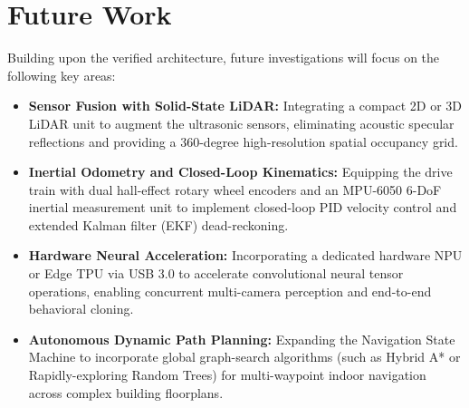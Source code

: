 \section{Future Work}
Building upon the verified architecture, future investigations will focus on the following key areas:
\begin{itemize}
    \item \textbf{Sensor Fusion with Solid-State LiDAR:} Integrating a compact 2D or 3D LiDAR unit to augment the ultrasonic sensors, eliminating acoustic specular reflections and providing a 360-degree high-resolution spatial occupancy grid.
    \item \textbf{Inertial Odometry and Closed-Loop Kinematics:} Equipping the drive train with dual hall-effect rotary wheel encoders and an MPU-6050 6-DoF inertial measurement unit to implement closed-loop PID velocity control and extended Kalman filter (EKF) dead-reckoning.
    \item \textbf{Hardware Neural Acceleration:} Incorporating a dedicated hardware NPU or Edge TPU via USB 3.0 to accelerate convolutional neural tensor operations, enabling concurrent multi-camera perception and end-to-end behavioral cloning.
    \item \textbf{Autonomous Dynamic Path Planning:} Expanding the Navigation State Machine to incorporate global graph-search algorithms (such as Hybrid A* or Rapidly-exploring Random Trees) for multi-waypoint indoor navigation across complex building floorplans.
\end{itemize}
